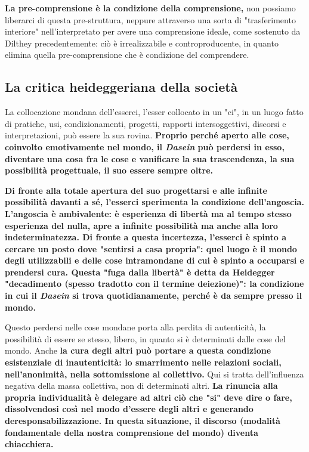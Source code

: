 \textbf{La pre-comprensione è la condizione della comprensione,}
non possiamo liberarci di questa pre-struttura, neppure
attraverso una sorta di  "trasferimento interiore"
nell'interpretato per avere una comprensione
ideale, come sostenuto da Dilthey precedentemente:
ciò è irrealizzabile e controproducente, in
quanto elimina quella pre-comprensione che è
condizione del comprendere.

\subsection{La critica heideggeriana della società}

La collocazione mondana dell'esserci, l'esser collocato
in un "ci", in un luogo fatto di pratiche,
usi, condizionamenti, progetti, rapporti intersoggettivi,
discorsi e interpretazioni, può essere la sua rovina.
\textbf{Proprio perché aperto alle cose, coinvolto
emotivamente nel mondo, il \textit{Dasein} può
perdersi in esso, diventare una cosa fra le cose e
vanificare la sua trascendenza, la sua possibilità
progettuale, il suo essere sempre oltre.}

\textbf{Di fronte alla totale apertura del suo progettarsi e
alle infinite possibilità davanti a sé, l'esserci sperimenta
la condizione dell'angoscia. L'angoscia è ambivalente:
è esperienza di libertà ma al tempo stesso esperienza del
nulla, apre a infinite possibilità ma anche alla loro
indeterminatezza. Di fronte a questa incertezza,
l'esserci è spinto a cercare un posto dove "sentirsi
a casa propria": quel luogo è il mondo degli
utilizzabili e delle cose intramondane di cui è
spinto a occuparsi e prendersi cura.
Questa "fuga dalla libertà" è detta da Heidegger
"decadimento (spesso tradotto con il termine deiezione)":
la condizione in cui il \textit{Dasein} si trova quotidianamente, perché è da sempre presso il mondo.} 

Questo perdersi nelle cose mondane porta alla perdita di
autenticità, la possibilità di essere se stesso, libero,
in quanto si è determinati dalle cose del mondo.
Anche \textbf{la cura degli altri può portare a questa
condizione esistenziale di inautenticità: lo
smarrimento nelle relazioni sociali, nell'anonimità,
nella sottomissione al collettivo.} Qui si tratta
dell'influenza negativa della massa collettiva,
non di determinati altri. \textbf{La rinuncia alla
propria individualità è delegare ad altri ciò
che "si" deve dire o fare, dissolvendosi così nel
modo d'essere degli altri e generando
deresponsabilizzazione. In questa situazione,
il discorso (modalità fondamentale della nostra
comprensione del mondo) diventa chiacchiera.}

